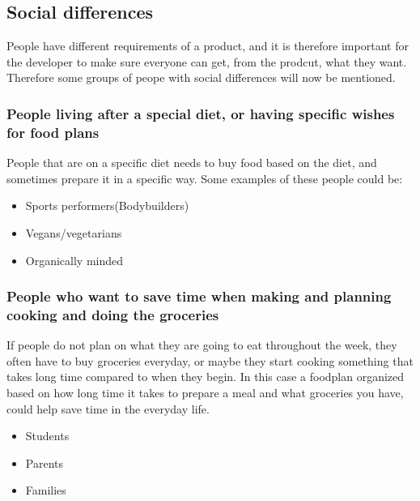 \subsection{Social differences}

People have different requirements of a product, and it is therefore important for the developer to make sure everyone can get, from the prodcut, what they want. Therefore some groups of peope with social differences will now be mentioned.

\subsubsection{People living after a special diet, or having specific wishes for food plans}
People that are on a specific diet needs to buy food based on the diet, and sometimes prepare it in a specific way.
Some examples of these people could be:
\begin{itemize}
\item Sports performers(Bodybuilders)
\item Vegans/vegetarians
\item Organically minded
\end{itemize}

\subsubsection{People who want to save time when making and planning cooking and doing the groceries} 
If people do not plan on what they are going to eat throughout the week, they often have to buy groceries everyday, or maybe they start cooking something that takes long time compared to when they begin. In this case a foodplan organized based on how long time it takes to prepare a meal and what groceries you have, could help save time in the everyday life.
\begin{itemize}
\item Students
\item Parents
\item Families
\end{itemize}

